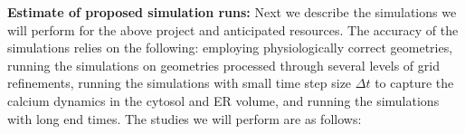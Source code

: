 \noindent \textbf{Estimate of proposed simulation runs:}
Next we describe the simulations we will perform for the above project and anticipated resources. The accuracy of the simulations relies on the following: employing physiologically correct geometries, running the simulations on geometries processed through several levels of grid refinements, running the simulations with small time step size $\Delta t$ to capture the calcium dynamics in the cytosol and ER volume, and running the simulations with long end times. The studies we will perform are as follows:
